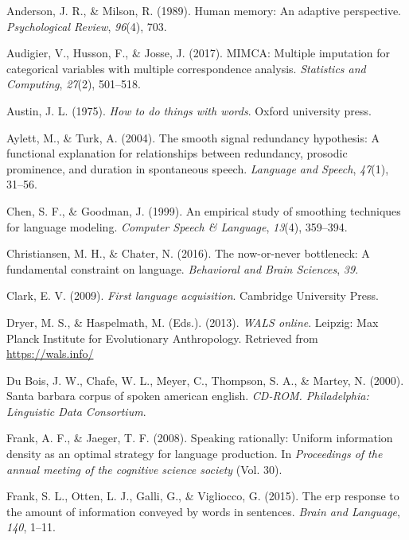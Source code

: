 \documentclass[
  english,
  man,floatsintext]{apa6}
\newlength{\cslhangindent}
\newenvironment{cslreferences}%
  {\setlength{\parindent}{0pt}%
  \everypar{\setlength{\hangindent}{\cslhangindent}}\ignorespaces}%
  {\par}
\begin{document}
\hypertarget{refs}{}
\begin{cslreferences}
\leavevmode\hypertarget{ref-anderson1989}{}%
Anderson, J. R., \& Milson, R. (1989). Human memory: An adaptive perspective. \emph{Psychological Review}, \emph{96}(4), 703.

\leavevmode\hypertarget{ref-audigier2017}{}%
Audigier, V., Husson, F., \& Josse, J. (2017). MIMCA: Multiple imputation for categorical variables with multiple correspondence analysis. \emph{Statistics and Computing}, \emph{27}(2), 501--518.

\leavevmode\hypertarget{ref-austin1975}{}%
Austin, J. L. (1975). \emph{How to do things with words}. Oxford university press.

\leavevmode\hypertarget{ref-aylett2004}{}%
Aylett, M., \& Turk, A. (2004). The smooth signal redundancy hypothesis: A functional explanation for relationships between redundancy, prosodic prominence, and duration in spontaneous speech. \emph{Language and Speech}, \emph{47}(1), 31--56.

\leavevmode\hypertarget{ref-chen1999}{}%
Chen, S. F., \& Goodman, J. (1999). An empirical study of smoothing techniques for language modeling. \emph{Computer Speech \& Language}, \emph{13}(4), 359--394.

\leavevmode\hypertarget{ref-christiansen2016}{}%
Christiansen, M. H., \& Chater, N. (2016). The now-or-never bottleneck: A fundamental constraint on language. \emph{Behavioral and Brain Sciences}, \emph{39}.

\leavevmode\hypertarget{ref-clark2009}{}%
Clark, E. V. (2009). \emph{First language acquisition}. Cambridge University Press.

\leavevmode\hypertarget{ref-wals}{}%
Dryer, M. S., \& Haspelmath, M. (Eds.). (2013). \emph{WALS online}. Leipzig: Max Planck Institute for Evolutionary Anthropology. Retrieved from \url{https://wals.info/}

\leavevmode\hypertarget{ref-sbc}{}%
Du Bois, J. W., Chafe, W. L., Meyer, C., Thompson, S. A., \& Martey, N. (2000). Santa barbara corpus of spoken american english. \emph{CD-ROM. Philadelphia: Linguistic Data Consortium}.

\leavevmode\hypertarget{ref-frank2008}{}%
Frank, A. F., \& Jaeger, T. F. (2008). Speaking rationally: Uniform information density as an optimal strategy for language production. In \emph{Proceedings of the annual meeting of the cognitive science society} (Vol. 30).

\leavevmode\hypertarget{ref-frank2015}{}%
Frank, S. L., Otten, L. J., Galli, G., \& Vigliocco, G. (2015). The erp response to the amount of information conveyed by words in sentences. \emph{Brain and Language}, \emph{140}, 1--11.


\end{cslreferences}
\end{document}
